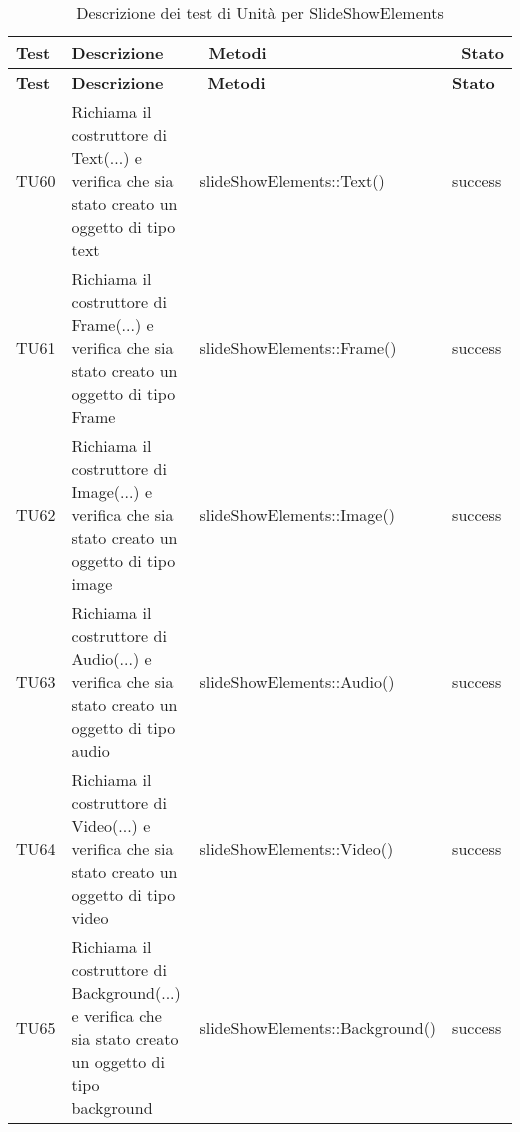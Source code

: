 		   \begin{longtable} [c]{| p{1cm} | p{6cm} | p{6cm} | p{1.5cm} |}
		 		 	 						\caption{Descrizione dei test di Unità per SlideShowElements \label{tab:verTestUnit}}\\
		 	  		 \hline
		 	  		 \textbf{Test} & \textbf{Descrizione} & \ \textbf{Metodi} & \ \textbf{Stato} \\
		 	  		 \hline
		 	  		 \endfirsthead
		 	  		 \hline
		 	  		 \textbf{Test} & \textbf{Descrizione} & \ \textbf{Metodi} & \textbf{Stato} \\
		 	  		 \hline
		 		 	 						\endhead
		 	  		 \hline
		 	  		 \endfoot
		 	  		 \hline
		 	  		 \endlastfoot
		  		 TU60 & Richiama il costruttore di Text(...) e verifica che sia stato creato un oggetto di tipo text  & slideShowElements::Text() & success \\
		  		 TU61 & Richiama il costruttore di Frame(...) e verifica che sia stato creato un oggetto di tipo Frame\ped{g} & slideShowElements::Frame() & success \\
		  		 TU62 & Richiama il costruttore di Image(...) e verifica che sia stato creato un oggetto di tipo image & slideShowElements::Image() & success \\
		  		 TU63 & Richiama il costruttore di Audio(...) e verifica che sia stato creato un oggetto di tipo audio  & slideShowElements::Audio() & success \\
		  		 TU64 & Richiama il costruttore di Video(...) e verifica che sia stato creato un oggetto di tipo video  & slideShowElements::Video() & success \\
		  		 TU65 & Richiama il costruttore di Background(...) e verifica che sia stato creato un oggetto di tipo background  & slideShowElements::Background() & success \\
		  		 
		  		 \end{longtable}
